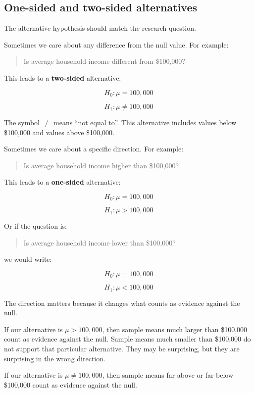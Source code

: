 \documentclass[
  letterpaper,
  DIV=11,
  numbers=noendperiod]{scrreprt}
\begin{document}
\subsection{One-sided and two-sided
alternatives}\label{one-sided-and-two-sided-alternatives}

The alternative hypothesis should match the research question.

Sometimes we care about any difference from the null value. For example:

\begin{quote}
Is average household income different from \$100,000?
\end{quote}

This leads to a \textbf{two-sided} alternative:

\[
H_0: \mu = 100{,}000
\]

\[
H_1: \mu \neq 100{,}000
\]

The symbol \(\neq\) means ``not equal to''. This alternative includes
values below \$100,000 and values above \$100,000.

Sometimes we care about a specific direction. For example:

\begin{quote}
Is average household income higher than \$100,000?
\end{quote}

This leads to a \textbf{one-sided} alternative:

\[
H_0: \mu = 100{,}000
\]

\[
H_1: \mu > 100{,}000
\]

Or if the question is:

\begin{quote}
Is average household income lower than \$100,000?
\end{quote}

we would write:

\[
H_0: \mu = 100{,}000
\]

\[
H_1: \mu < 100{,}000
\]

The direction matters because it changes what counts as evidence against
the null.

If our alternative is \(\mu > 100{,}000\), then sample means much larger
than \$100,000 count as evidence against the null. Sample means much
smaller than \$100,000 do not support that particular alternative. They
may be surprising, but they are surprising in the wrong direction.

If our alternative is \(\mu \neq 100{,}000\), then sample means far
above or far below \$100,000 count as evidence against the null.
\end{document}
